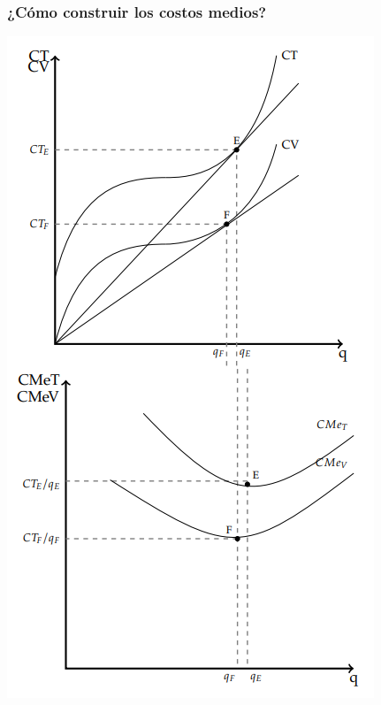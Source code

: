 \documentclass{beamer}
\begin{document}
\begin{frame}
\frametitle{¿Cómo construir los costos medios?}
\centering
\includegraphics[scale=0.5]{../Figures/C13.6.png}
\end{frame}
\end{document}
